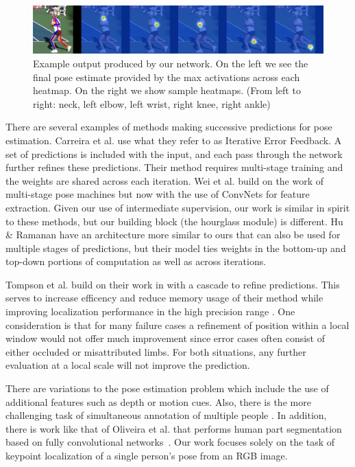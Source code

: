 \documentclass[runningheads]{llncs}
\begin{document}
\begin{figure}[t]
\centering
\includegraphics[width=\textwidth]{img/exheatmaps}
\caption{Example output produced by our network. On the left we see
  the final pose estimate provided by the max activations across each
  heatmap. On the right we show sample heatmaps. (From left to right:
  neck, left elbow, left wrist, right knee, right ankle)}
\label{fig:exheatmaps}
\end{figure}

There are several examples of methods making successive predictions
for pose estimation. Carreira et al. \cite{carreira2015human} use what
they refer to as Iterative Error Feedback. A set of predictions is
included with the input, and each pass through the network further
refines these predictions. Their method requires multi-stage training
and the weights are shared across each iteration. Wei et
al. \cite{wei2016machines} build on the work of multi-stage pose
machines \cite{ramakrishna2014pose} but now with the use of ConvNets
for feature extraction. Given our use of intermediate supervision, our
work is similar in spirit to these methods, but our building block
(the hourglass module) is different. Hu \& Ramanan
\cite{hu2016bottomup} have an architecture more similar to ours that
can also be used for multiple stages of predictions, but their model
ties weights in the bottom-up and top-down portions of computation as
well as across iterations.

Tompson et al. build on their work in \cite{tompson2014joint} with a
cascade to refine predictions. This serves to increase efficency and
reduce memory usage of their method while improving localization
performance in the high precision range \cite{tompson2015efficient}.
One consideration is that for many failure cases a refinement of
position within a local window would not offer much improvement since
error cases often consist of either occluded or misattributed
limbs. For both situations, any further evaluation at a local scale
will not improve the prediction.
 
There are variations to the pose estimation problem which include the
use of additional features such as depth or motion cues.
\cite{jain2014modeep, shotton2013depth, pfister2015flowing} Also,
there is the more challenging task of simultaneous annotation of
multiple people \cite{chen2015parsing, pish15deepcut}. In addition,
there is work like that of Oliveira et al. \cite{oliveira2016deep}
that performs human part segmentation based on fully convolutional
networks~\cite{long2015fully}. Our work focuses solely on the task
of keypoint localization of a single person's pose from an RGB image.
\end{document}
